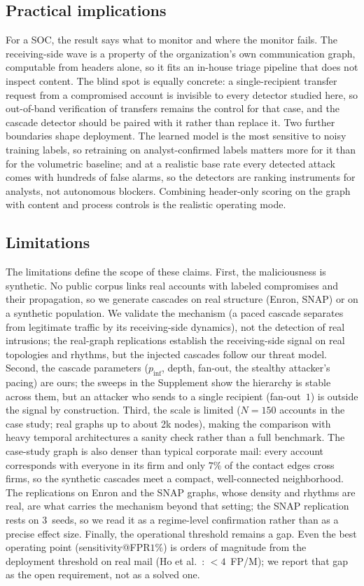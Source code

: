 \subsection{Practical implications}
For a SOC, the result says what to monitor and where the monitor fails. The receiving-side wave is a
property of the organization's own communication graph, computable from headers alone, so it fits an in-house
triage pipeline that does not inspect content. The blind spot is equally concrete: a single-recipient
transfer request from a compromised account is invisible to every detector studied here, so out-of-band
verification of transfers remains the control for that case, and the cascade detector should be paired with
it rather than replace it. Two further boundaries shape deployment. The learned model is the most sensitive to
noisy training labels, so retraining on analyst-confirmed labels matters more for it than for the volumetric
baseline; and at a realistic base rate every detected attack comes with hundreds of false alarms, so the
detectors are ranking instruments for analysts, not autonomous blockers. Combining header-only scoring on
the graph with content and process controls is the realistic operating mode.

\subsection{Limitations}
The limitations define the scope of these claims. First, the maliciousness is synthetic. No public corpus
links real accounts with labeled compromises and their propagation, so we generate cascades on real structure
(Enron, SNAP) or on a synthetic population. We validate the mechanism (a paced cascade separates from
legitimate traffic by its receiving-side dynamics), not the detection of real intrusions; the real-graph
replications establish the receiving-side signal on real topologies and rhythms, but the injected cascades
follow our threat model. Second, the cascade parameters ($p_\mathrm{inf}$, depth, fan-out, the stealthy
attacker's pacing) are ours; the sweeps in the Supplement show the hierarchy is stable across them, but an
attacker who sends to a single recipient (fan-out~$1$) is outside the signal by construction. Third, the scale is limited
($N{=}150$ accounts in the case study; real graphs up to about 2k nodes), making the comparison with heavy
temporal architectures a sanity check rather than a full benchmark. The case-study graph is also denser than
typical corporate mail: every account corresponds with everyone in its firm and only $7\%$ of the contact
edges cross firms, so the synthetic cascades meet a compact, well-connected neighborhood. The replications on
Enron and the SNAP graphs, whose density and rhythms are real, are what carries the mechanism beyond that
setting; the SNAP replication rests on $3$~seeds, so we read it as a regime-level confirmation rather than as
a precise effect size. Finally, the operational threshold remains
a gap. Even the best operating point (sensitivity@FPR$1\%$) is orders of magnitude from the deployment
threshold on real mail (Ho et al.\ \citep{ho2019detecting}: $<\!4$~FP/M); we report that gap as the open
requirement, not as a solved one.

